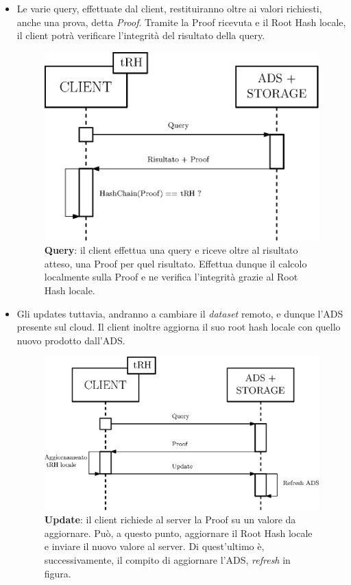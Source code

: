 		\begin{itemize}
			\item Le varie query, effettuate dal client, restituiranno oltre ai valori richiesti, anche una prova, detta \textit{Proof}. Tramite la Proof ricevuta e il Root Hash locale, il client potrà verificare l'integrità del risultato della query.
			
			\begin{figure}
				\centering
				\includegraphics[scale=0.75]{figure/queryADS.eps}
				\caption{\textbf{Query}: il client effettua una query e riceve oltre al risultato atteso, una Proof per quel risultato. Effettua dunque il calcolo localmente sulla Proof e ne verifica l'integrità grazie al Root Hash locale.}\label{fig:4}
			\end{figure}
			
			\item Gli updates tuttavia, andranno a cambiare il \textit{dataset} remoto, e dunque l'ADS presente sul cloud. Il client inoltre aggiorna il suo root hash locale con quello nuovo prodotto dall'ADS.
			
			\begin{figure}
				\centering
				\includegraphics[scale=0.75]{figure/updateADS.eps}
				\caption{\textbf{Update}: il client richiede al server la Proof su un valore da aggiornare. Può, a questo punto, aggiornare il Root Hash locale e inviare il nuovo valore al server. Di quest'ultimo è, successivamente, il compito di aggiornare l'ADS, \textit{refresh} in figura.}\label{fig:5}
			\end{figure}
		
		\end{itemize}
	

